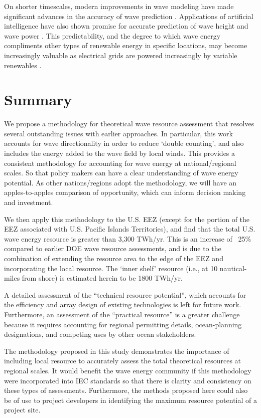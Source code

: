 On shorter timescales, modern improvements in wave modeling have made significant advances in the accuracy of wave prediction \citep{cavaleriWaveModellingCoastal2018}. Applications of artificial intelligence have also shown promise for accurate prediction of wave height and wave power \citep[e.g.][]{cornejo-bueno_significant_2016}. This predictability, and the degree to which wave energy compliments other types of renewable energy in specific locations, may become increasingly valuable as electrical grids are powered increasingly by variable renewables \cite{parkinsonIntegratingOceanWave2015}.



\section{Summary} \label{sec:conclusion}

We propose a methodology for theoretical wave resource assessment that resolves several outstanding issues with earlier approaches. In particular, this work accounts for wave directionality in order to reduce `double counting', and also includes the energy added to the wave field by local winds. This provides a consistent methodology for accounting for wave energy at national/regional scales. So that policy makers can have a clear understanding of wave energy potential. As other nations/regions adopt the methodology, we will have an apples-to-apples comparison of opportunity, which can inform decision making and investment.

We then apply this methodology to the U.S. EEZ (except for the portion of the EEZ associated with U.S. Pacific Islands Territories), and find that the total U.S. wave energy resource is greater than 3,300 TWh/yr.
This is an increase of ~25\% compared to earlier DOE wave resource assessments, and is due to the combination of extending the resource area to the edge of the EEZ and incorporating the local resource. The `inner shelf' resource (i.e., at 10 nautical-miles from shore) is estimated herein to be 1800 TWh/yr.

A detailed assessment of the ``technical resource potential'', which accounts for the efficiency and array design of existing technologies is left for future work. Furthermore, an assessment of the ``practical resource'' is a greater challenge because it requires accounting for regional permitting details, ocean-planning designations, and competing uses by other ocean stakeholders.

The methodology proposed in this study demonstrates the importance of including local resource to accurately assess the total theoretical resources at regional scales. It would benefit the wave energy community if this methodology were incorporated into IEC standards so that there is clarity and consistency on these types of assessments. Furthermore, the methods proposed here could also be of use to project developers in identifying the maximum resource potential of a project site.

